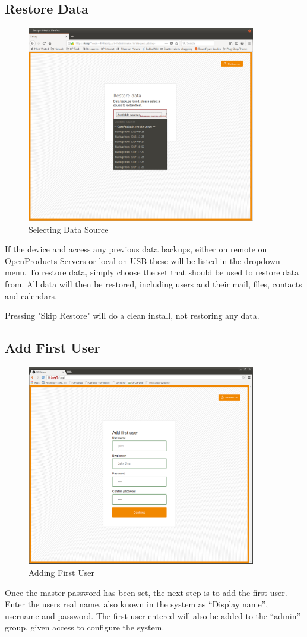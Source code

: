 \documentclass[12pt,a4paper,titlepage]{article}
\begin{document}
\newpage
\subsection{Restore Data}
\begin{figure}[h!]
\centering
\includegraphics[width=10cm]{./img/restore}
\caption{Selecting Data Source}
\end{figure}
If the device and access any previous data backups, either on remote on OpenProducts Servers or local on USB these will be listed in the dropdown menu. To restore data, simply choose the set that should be used to restore data from. All data will then be restored, including users and their mail, files, contacts and calendars.

Pressing "Skip Restore" will do a clean install, not restoring any data.

\newpage
\subsection{Add First User}
\begin{figure}[h!]
\centering
\includegraphics[width=10cm]{./img/first_user}
\caption{Adding First User}
\end{figure}
Once the master password has been set, the next step is to add the first user. Enter the users real name, also known in the system as ``Display name'', username and password. The first user entered will also be added to the ``admin'' group, given access to configure the system.
\end{document}
